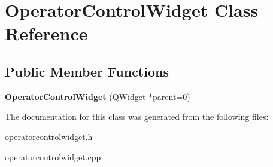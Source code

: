 \hypertarget{classOperatorControlWidget}{\section{Operator\-Control\-Widget Class Reference}
\label{classOperatorControlWidget}
}
\subsection*{Public Member Functions}
\begin{DoxyCompactItemize}
\item 
\hypertarget{classOperatorControlWidget_a6c4f30d34ce323ee954d014345fe6b0d}{{\bfseries Operator\-Control\-Widget} (Q\-Widget $\ast$parent=0)}\label{classOperatorControlWidget_a6c4f30d34ce323ee954d014345fe6b0d}

\end{DoxyCompactItemize}


The documentation for this class was generated from the following files\-:\begin{DoxyCompactItemize}
\item 
operatorcontrolwidget.\-h\item 
operatorcontrolwidget.\-cpp\end{DoxyCompactItemize}
